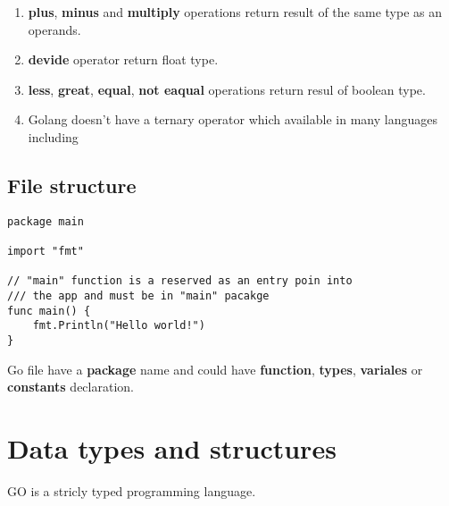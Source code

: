\documentclass[12pt]{article}
\begin{document}
\begin{paracol}{2}
\begin{leftcolumn}
\end{leftcolumn} \begin{rightcolumn}
\begin{enumerate}
    \item\textbf{plus}, \textbf{minus} and \textbf{multiply} operations return
        result of the same type as an operands.
    \item \textbf{devide} operator return float type.
    \item \textbf{less}, \textbf{great}, \textbf{equal}, \textbf{not eaqual}
        operations return resul of boolean type.
    \item Golang doesn't have a ternary operator which available in many languages
        including
\end{enumerate}
\end{rightcolumn}
\end{paracol}

\subsection{File structure}
\begin{paracol}{2}
\begin{leftcolumn}
\begin{lstlisting}
package main

import "fmt"

// "main" function is a reserved as an entry poin into
/// the app and must be in "main" pacakge
func main() {
    fmt.Println("Hello world!")
}
\end{lstlisting}
\end{leftcolumn} \begin{rightcolumn}
Go file have a \textbf{package} name and could have \textbf{function},
\textbf{types}, \textbf{variales} or \textbf{constants} declaration.
\end{rightcolumn}
\end{paracol}

\newpage
\section{Data types and structures}
GO is a stricly typed programming language.
\end{document}
